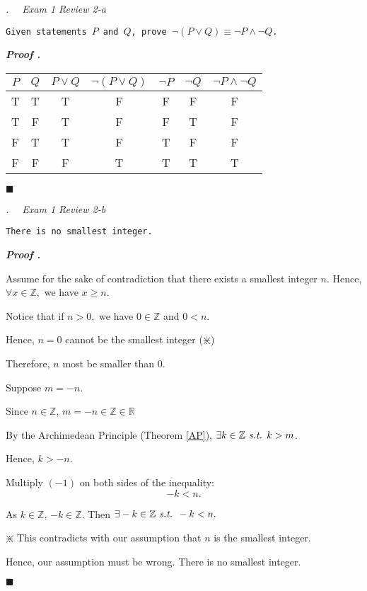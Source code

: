 \documentclass[10pt,letter]{article}
\newcounter{nq}[section]
\newcounter{np}[section]
\newenvironment*{p}{\par\noindent\textbf{\textit{Proof \stepcounter{np}\thenp. }}\par}{\par\hfill $\blacksquare$\par}
\newenvironment*{q}[1]{\noindent\emph{\thesection.\stepcounter{nq}\thenq$\quad $ #1}\par\noindent\texttt}{}
\def\Z{{\mathbb{Z}}}
\def\R{{\mathbb{R}}}
\def\st{\emph{ s.t. }}
\begin{document}
\begin{framed}\begin{q}
	{Exam 1 Review 2-a}
	{Given statements $P$ and $Q$, prove $\neg(P\vee Q)\equiv\neg P\wedge\neg Q$.}
\end{q}\end{framed}
\begin{p}
	\begin{center}\begin{tabular}{c|c|c|c|c|c|c}
		$P$&$Q$&$P\vee Q$&$\neg(P\vee Q)$&$\neg P$&$\neg Q$&$\neg P\wedge\neg Q$\\
		\hline
		T&T&T&F&F&F&F\\
		T&F&T&F&F&T&F\\
		F&T&T&F&T&F&F\\
		F&F&F&T&T&T&T
	\end{tabular}\end{center}
\end{p}

\begin{framed}\begin{q}
	{Exam 1 Review 2-b}
	{There is no smallest integer.}
\end{q}\end{framed}
\begin{p}
	Assume for the sake of contradiction that there exists a smallest integer $n$. Hence, $\forall x\in\Z,$ we have $x\geq n.$\par Notice that if $n>0,$ we have $0\in\Z$ and $0<n.$\par Hence, $n=0$ cannot be the smallest integer ($\divideontimes$)\par Therefore, $n$ most be smaller than $0$.\par Suppose $m=-n$.\par Since $n\in\Z$, $m=-n\in\Z\in\R$\par By the Archimedean Principle (Theorem \ref{AP}), $\exists k\in\Z\st k>m$.\par Hence, $k>-n.$\par Multiply $(-1)$ on both sides of the inequality: \[-k<n.\]\par As $k\in\Z$, $-k\in\Z$. Then $\exists -k\in\Z\st -k<n.$\par\begin{center}$\divideontimes$ This contradicts with our assumption that $n$ is the smallest integer. \end{center}\par Hence, our assumption must be wrong. There is no smallest integer. 
\end{p}
\end{document}
